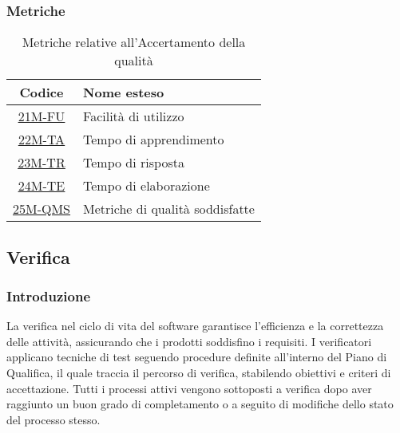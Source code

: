 \subsubsection{Metriche}
\begin{table}[!h]
	\centering
	\begin{tabular}{ | c | l | }
		\hline
		\textbf{Codice}                      & \textbf{Nome esteso}            \\
		\hline
		\underline{\hyperlink{21M}{21M-FU}}  & Facilità di utilizzo            \\
        \underline{\hyperlink{22M}{22M-TA}}  & Tempo di apprendimento          \\
        \underline{\hyperlink{23M}{23M-TR}}  & Tempo di risposta               \\
        \underline{\hyperlink{24M}{24M-TE}}  & Tempo di elaborazione           \\
        \underline{\hyperlink{25M}{25M-QMS}} & Metriche di qualità soddisfatte \\
		\hline
	\end{tabular}
	\caption{Metriche relative all'Accertamento della qualità}
\end{table}

\subsection{Verifica}
\subsubsection{Introduzione}
La verifica nel ciclo di vita del software garantisce l'efficienza e la correttezza delle attività, assicurando che i prodotti soddisfino i requisiti. I verificatori applicano tecniche di test seguendo procedure definite all'interno del Piano di Qualifica, il quale traccia il percorso di verifica, stabilendo obiettivi e criteri di accettazione. Tutti i processi attivi vengono sottoposti a verifica dopo aver raggiunto un buon grado di completamento o a seguito di modifiche dello stato del processo stesso.

